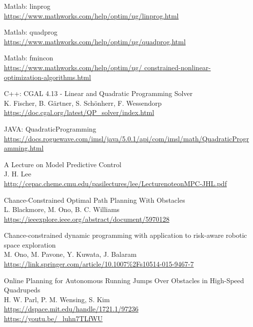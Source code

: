 \documentclass{article}
\begin{document}
\begin{thebibliography}{1}
        Matlab: linprog
        \\
        \url{ https://www.mathworks.com/help/optim/ug/linprog.html }
        
        Matlab: quadprog
        \\
        \url{ https://www.mathworks.com/help/optim/ug/quadprog.html }

        Matlab: fmincon
        \\
        \url{ https://www.mathworks.com/help/optim/ug/
        constrained-nonlinear-optimization-algorithms.html }
    
        C++: CGAL 4.13 - Linear and Quadratic Programming Solver
        \\
        K. Fischer, B. Gärtner, S. Schönherr, F. Wessendorp
        \\
        \url{ https://doc.cgal.org/latest/QP_solver/index.html }

        JAVA: QuadraticProgramming
        \\
        \url{ https://docs.roguewave.com/imsl/java/5.0.1/api/com/imsl/math/QuadraticProgramming.html }

        A Lecture on Model Predictive Control
        \\
        J. H. Lee
        \\
        \url{ http://cepac.cheme.cmu.edu/pasilectures/lee/LecturenoteonMPC-JHL.pdf }

        Chance-Constrained Optimal Path Planning With Obstacles
        \\
        L. Blackmore, M. Ono, B. C. Williams
        \\
        \url{ https://ieeexplore.ieee.org/abstract/document/5970128 }

        Chance-constrained dynamic programming with application to risk-aware robotic space exploration
        \\
        M. Ono, M. Pavone, Y. Kuwata, J. Balaram
        \\
        \url{ https://link.springer.com/article/10.1007%2Fs10514-015-9467-7 }

        Online Planning for Autonomous Running Jumps Over Obstacles in High-Speed Quadrupeds
        \\
        H. W. Parl, P. M. Wensing, S. Kim
        \\
        \url{ https://dspace.mit.edu/handle/1721.1/97236 }   
        \\
        \url{ https://youtu.be/_luhn7TLfWU }


\end{thebibliography}
\end{document}
